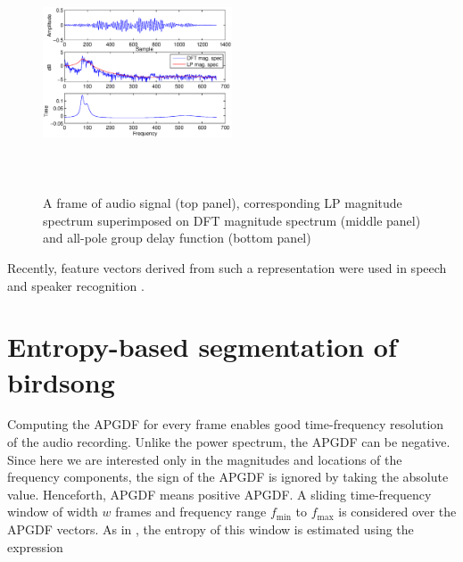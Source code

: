 \documentclass[a4paper]{article}
\begin{document}
\begin{figure}[h]

\includegraphics[width=0.5\textwidth,height=7cm]
{apgd.eps}
\caption{ A frame of audio signal (top panel), corresponding LP
magnitude spectrum superimposed on DFT magnitude spectrum (middle panel) and
all-pole group delay function (bottom panel)  }
\label{fig:all-pole}
\end{figure}


Recently, feature vectors
derived from such a representation were used in speech \cite{drugman} and speaker
recognition \cite{padman}. 









\section{Entropy-based segmentation of birdsong}

Computing the APGDF for every frame enables good time-frequency resolution of
the audio recording. Unlike the power spectrum, the APGDF can be negative.
Since here we are interested only in the magnitudes and locations of the
frequency components, the sign of the APGDF is ignored by taking the absolute
value. Henceforth, APGDF means positive APGDF.  A sliding time-frequency window
of width $w$ frames and frequency range $f_{\min}$ to $f_{\max}$ is considered over the
APGDF vectors. As in \cite{wang2013}, the entropy of this window is estimated
using the expression
\end{document}
